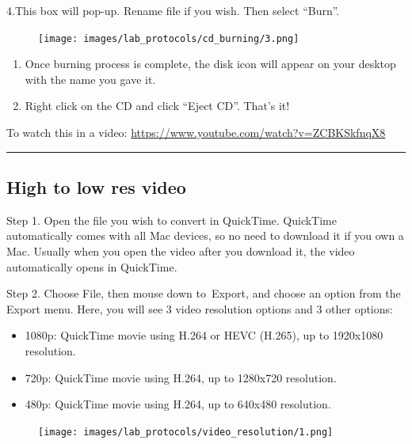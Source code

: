 \documentclass[
]{book}
\providecommand{\tightlist}{%
  \setlength{\itemsep}{0pt}\setlength{\parskip}{0pt}}
\begin{document}
4.This box will pop-up. Rename file if you wish. Then select ``Burn''.

\begin{figure}
\centering
\texttt{[image: images/lab\_protocols/cd\_burning/3.png]}
\caption{}
\end{figure}

\begin{enumerate}
\def\labelenumi{\arabic{enumi}.}
\setcounter{enumi}{4}
\item
  Once burning process is complete, the disk icon will appear on your desktop with the name you gave it.
\item
  Right click on the CD and click ``Eject CD''. That's it!
\end{enumerate}

To watch this in a video: \url{https://www.youtube.com/watch?v=ZCBKSkfnqX8}

\begin{center}\rule{0.5\linewidth}{0.5pt}\end{center}

\hypertarget{high-to-low-res-video}{%
\subsection{High to low res video}\label{high-to-low-res-video}}

Step 1. Open the file you wish to convert in QuickTime. QuickTime automatically comes with all Mac devices, so no need to download it if you own a Mac. Usually when you open the video after you download it, the video automatically opens in QuickTime.

Step 2. Choose File, then mouse down to~Export, and choose an option from the Export menu.
Here, you will see 3 video resolution options and 3 other options:

\begin{itemize}
\tightlist
\item
  1080p: QuickTime movie using H.264 or HEVC (H.265), up to 1920x1080 resolution.
\item
  720p: QuickTime movie using H.264, up to 1280x720 resolution.
\item
  480p: QuickTime movie using H.264, up to 640x480 resolution.
\end{itemize}

\begin{figure}
\centering
\texttt{[image: images/lab\_protocols/video\_resolution/1.png]}
\caption{}
\end{figure}
\end{document}
